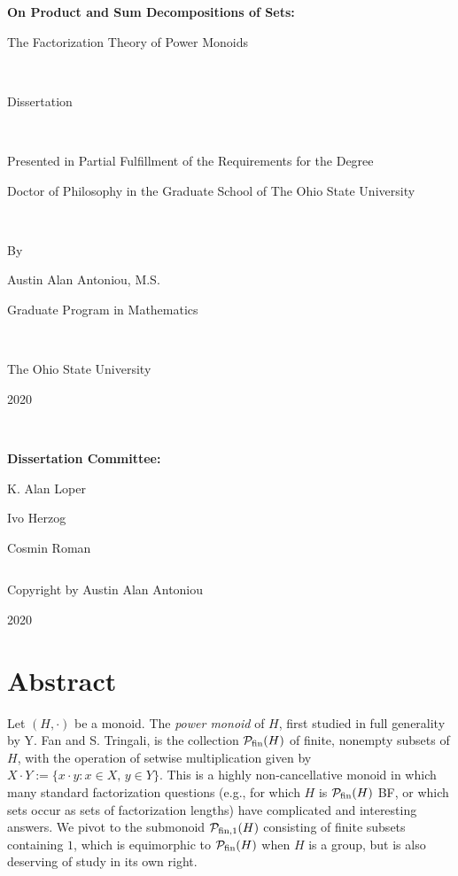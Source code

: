\frontmatter

\begin{titlepage}
\hspace{0pt}
\vfill
\begin{center}
	{\LARGE \bf On Product and Sum Decompositions of Sets: \\ \vspace{3mm}
		
		The Factorization Theory of Power Monoids}

\

	Dissertation

\
	
	Presented in Partial Fulfillment of the Requirements 
	for the Degree 
	
	Doctor of Philosophy 
	in the Graduate School of The Ohio State University

\
		
	By 
	
	{\large Austin Alan Antoniou, M.S. 
	
	Graduate Program in Mathematics}

\
	
	The Ohio State University
	
	2020

\

	{\large {\bf Dissertation Committee:}
	
	K. Alan Loper
	
	Ivo Herzog
	
	Cosmin Roman}
\end{center}
\vfill
\end{titlepage}

\newpage
$~$
\thispagestyle{empty}
\newpage

\hspace{0pt}
\vfill
\begin{center}
{\Large Copyright by Austin Alan Antoniou

2020}
\end{center}
\setcounter{page}{1}
\vfill
\thispagestyle{empty}
\chapter{Abstract}
Let $(H,\cdot)$ be a monoid.
The \textit{power monoid} of $H$, first studied in full generality by Y. Fan and S. Tringali, is the collection $\mathcal{P}_{\textrm{fin}}(H)$ of finite, nonempty subsets of $H$, with the operation of setwise multiplication given by $X\cdot Y := \{x\cdot y: x\in X, \, y\in Y\}$.
This is a highly non-cancellative monoid in which many standard factorization questions (e.g., for which $H$ is $\mathcal{P}_{\textrm{fin}}(H)$ BF, or which sets occur as sets of factorization lengths) have complicated and interesting answers.
We pivot to the submonoid $\mathcal{P}_{\textrm{fin}, 1}(H)$ consisting of finite subsets containing $1$, which is equimorphic to $\mathcal{P}_{\textrm{fin}}(H)$ when $H$ is a group, but is also deserving of study in its own right.

